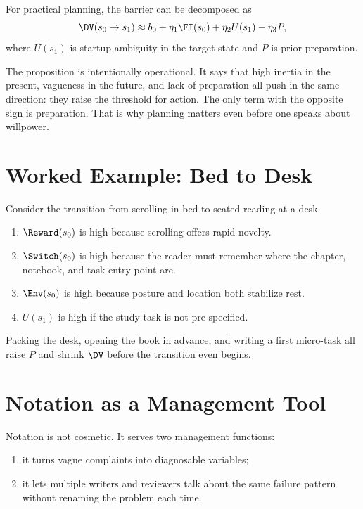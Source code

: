 \begin{proposition}
For practical planning, the barrier can be decomposed as
\[
  \DV(s_0 \to s_1) \approx b_0 + \eta_1 \FI(s_0) + \eta_2 U(s_1) - \eta_3 P,
\]
where $U(s_1)$ is startup ambiguity in the target state and $P$ is prior
preparation.
\end{proposition}

\begin{discussion}
The proposition is intentionally operational. It says that high inertia in the
present, vagueness in the future, and lack of preparation all push in the same
direction: they raise the threshold for action. The only term with the
opposite sign is preparation. That is why planning matters even before one
speaks about willpower.
\end{discussion}

\section{Worked Example: Bed to Desk}

\begin{example}
Consider the transition from scrolling in bed to seated reading at a desk.
\begin{enumerate}[nosep]
  \item $\Reward(s_0)$ is high because scrolling offers rapid novelty.
  \item $\Switch(s_0)$ is high because the reader must remember where the
        chapter, notebook, and task entry point are.
  \item $\Env(s_0)$ is high because posture and location both stabilize rest.
  \item $U(s_1)$ is high if the study task is not pre-specified.
\end{enumerate}
Packing the desk, opening the book in advance, and writing a first micro-task
all raise $P$ and shrink $\DV$ before the transition even begins.
\end{example}

\section{Notation as a Management Tool}

Notation is not cosmetic. It serves two management functions:
\begin{enumerate}[nosep]
  \item it turns vague complaints into diagnosable variables;
  \item it lets multiple writers and reviewers talk about the same failure
        pattern without renaming the problem each time.
\end{enumerate}

